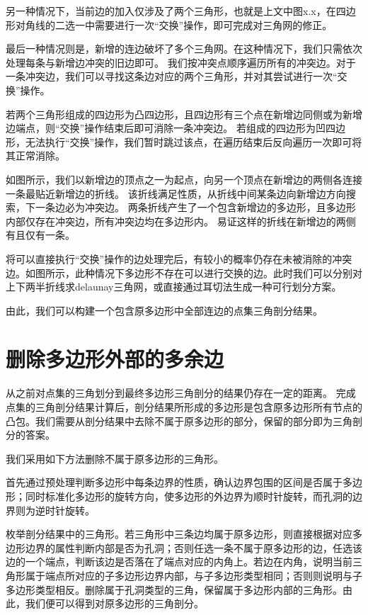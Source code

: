 另一种情况下，当前边的加入仅涉及了两个三角形，也就是上文中图x.x，在四边形对角线的二选一中需要进行一次“交换”操作，即可完成对三角网的修正。

最后一种情况则是，新增的连边破坏了多个三角网。在这种情况下，我们只需依次处理每条与新增边冲突的旧边即可。
我们按冲突点顺序遍历所有的冲突边。对于一条冲突边，我们可以寻找这条边对应的两个三角形，并对其尝试进行一次“交换”操作。

若两个三角形组成的四边形为凸四边形，且四边形有三个点在新增边同侧或为新增边端点，则“交换”操作结束后即可消除一条冲突边。
若组成的四边形为凹四边形，无法执行“交换”操作，我们暂时跳过该点，在遍历结束后反向遍历一次即可将其正常消除。

如图所示，我们以新增边的顶点之一为起点，向另一个顶点在新增边的两侧各连接一条最贴近新增边的折线。
该折线满足性质，从折线中间某条边向新增边方向搜索，下一条边必为冲突边。
两条折线产生了一个包含新增边的多边形，且多边形内部仅存在冲突边，所有冲突边均在多边形内。
易证这样的折线在新增边的两侧有且仅有一条。

将可以直接执行“交换”操作的边处理完后，有较小的概率仍存在未被消除的冲突边。如图所示，此种情况下多边形不存在可以进行交换的边。此时我们可以分别对上下两半折线求delaunay三角网，或直接通过耳切法生成一种可行划分方案。

由此，我们可以构建一个包含原多边形中全部连边的点集三角剖分结果。

\section{删除多边形外部的多余边}

从之前对点集的三角划分到最终多边形三角剖分的结果仍存在一定的距离。
完成点集的三角剖分结果计算后，剖分结果所形成的多边形是包含原多边形所有节点的凸包。我们需要从剖分结果中去除不属于原多边形的部分，保留的部分即为三角剖分的答案。

我们采用如下方法删除不属于原多边形的三角形。

首先通过预处理判断多边形中每条边界的性质，确认边界包围的区间是否属于多边形；同时标准化多边形的旋转方向，使多边形的外边界为顺时针旋转，而孔洞的边界则为逆时针旋转。

枚举剖分结果中的三角形。若三角形中三条边均属于原多边形，则直接根据对应多边形边界的属性判断内部是否为孔洞；否则任选一条不属于原多边形的边，任选该边的一个端点，判断该边是否落在了端点对应的内角上。若边在内角，说明当前三角形属于端点所对应的子多边形边界内部，与子多边形类型相同；否则则说明与子多边形类型相反。删除属于孔洞类型的三角，保留属于多边形内部的三角形。由此，我们便可以得到对原多边形的三角剖分。
